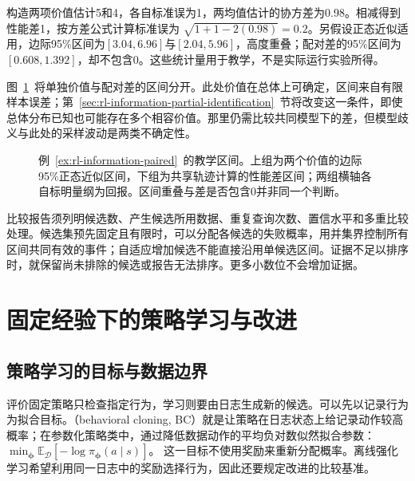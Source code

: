 \begin{example}[价值区间重叠仍可比较性能差]
  \label{ex:rl-information-paired}
  构造两项价值估计5和4，各自标准误为1，两均值估计的协方差为0.98。相减得到性能差1，按方差公式计算标准误为
  $\sqrt{1+1-2(0.98)}=0.2$。另假设正态近似适用，边际95\%区间为$[3.04,6.96]$与$[2.04,5.96]$，高度重叠；配对差的95\%区间为$[0.608,1.392]$，却不包含0。这些统计量用于教学，不是实际运行实验所得。
\end{example}

图~\ref{fig:rl-information-comparison}~将单独价值与配对差的区间分开。此处价值在总体上可确定，区间来自有限样本误差；第~\ref{sec:rl-information-partial-identification}~节将改变这一条件，即使总体分布已知也可能存在多个相容价值。那里仍需比较共同模型下的差，但模型歧义与此处的采样波动是两类不确定性。

\begin{figure}[htbp]
  \centering
  
  \caption{例~\ref{ex:rl-information-paired}~的教学区间。上组为两个价值的边际95\%正态近似区间，下组为共享轨迹计算的性能差区间；两组横轴各自标明量纲为回报。区间重叠与差是否包含0并非同一个判断。}
  \label{fig:rl-information-comparison}
\end{figure}

比较报告须列明候选数、产生候选所用数据、重复查询次数、置信水平和多重比较处理。候选集预先固定且有限时，可以分配各候选的失败概率，用并集界控制所有区间共同有效的事件；自适应增加候选不能直接沿用单候选区间。证据不足以排序时，就保留尚未排除的候选或报告无法排序。更多小数位不会增加证据。

\section{固定经验下的策略学习与改进}
\label{sec:rl-information-offline-learning}

\subsection{策略学习的目标与数据边界}
\label{sec:rl-information-learning-boundary}

评价固定策略只检查指定行为，学习则要由日志生成新的候选。可以先以记录行为为拟合目标。（behavioral cloning, BC）就是让策略在日志状态上给记录动作较高概率；在参数化策略类中，通过降低数据动作的平均负对数似然拟合参数：
$\min_{\bm\phi}\mathbb E_{\mathcal D}[-\log\pi_{\bm\phi}(a\mid s)]$。
这一目标不使用奖励来重新分配概率。离线强化学习希望利用同一日志中的奖励选择行为，因此还要规定改进的比较基准。

